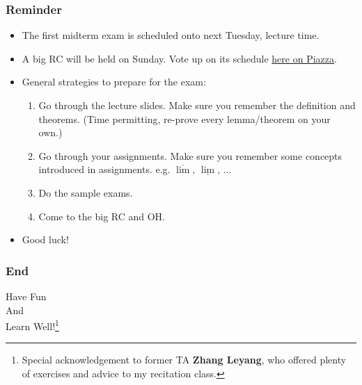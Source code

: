 \documentclass[10pt, t]{beamer}
\begin{document}
\begin{frame}
    \frametitle{Reminder}

    \begin{itemize}
        \item The first midterm exam is scheduled onto next Tuesday, lecture time.
        \item A big RC will be held on Sunday. Vote up on its schedule \href{https://piazza.com/class/kdvbtz3cxva7mb?cid=60}{here on Piazza}.
        \item General strategies to prepare for the exam:
        \begin{enumerate}
            \item Go through the lecture slides. Make sure you remember the definition and theorems. (Time permitting, re-prove every lemma/theorem on your own.)
            \item Go through your assignments. Make sure you remember some concepts introduced in assignments. e.g. $\overline{\lim},\,\underline{\lim},\,\dots$
            \item Do the sample exams.
            \item Come to the big RC and OH.
        \end{enumerate}
        \item Good luck!
    \end{itemize}

\end{frame}

\begin{frame}
    \frametitle{End}
    \vspace{2.2cm}
    \begin{center}
        \Large
        Have Fun \\
        And \\
        Learn Well!\footnote[frame]{Special acknowledgement to former TA \textbf{Zhang Leyang}, who offered plenty of exercises and advice to my recitation class.}
    \end{center}
\end{frame}
\end{document}
